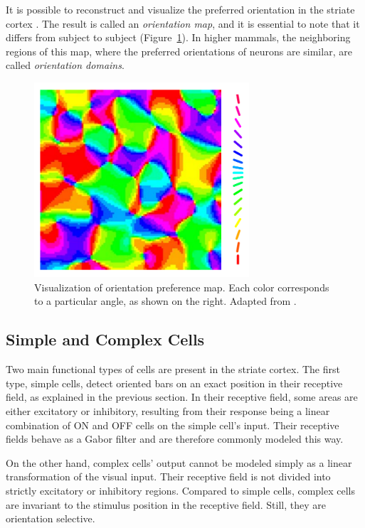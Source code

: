 It is possible to reconstruct and visualize the preferred orientation in the striate cortex \citep{smith2018distributed}. The result is called an \emph{orientation map}, and it is essential to note that it differs from subject to subject (Figure~\ref{ori_map_first}). In higher mammals, the neighboring regions of this map, where the preferred orientations of neurons are similar, are called \emph{orientation domains}.

\begin{figure}[H]\centering
	\includegraphics[width=80mm]{../img/orientation_map.png}
	\caption{Visualization of orientation preference map. Each color corresponds to a particular angle, as shown on the right. Adapted from \citep{lam2005self}.}
	\label{ori_map_first}
\end{figure}


\subsection{Simple and Complex Cells}

Two main functional types of cells are present in the striate cortex. The first type, simple cells, detect oriented bars on an exact position in their receptive field, as explained in the previous section. In their receptive field, some areas are either excitatory or inhibitory, resulting from their response being a linear combination of ON and OFF cells on the simple cell’s input. Their receptive fields behave as a Gabor filter and are therefore commonly modeled this way.

On the other hand, complex cells’ output cannot be modeled simply as a linear transformation of the visual input. Their receptive field is not divided into strictly excitatory or inhibitory regions. Compared to simple cells, complex cells are invariant to the stimulus position in the receptive field. Still, they are orientation selective. 








